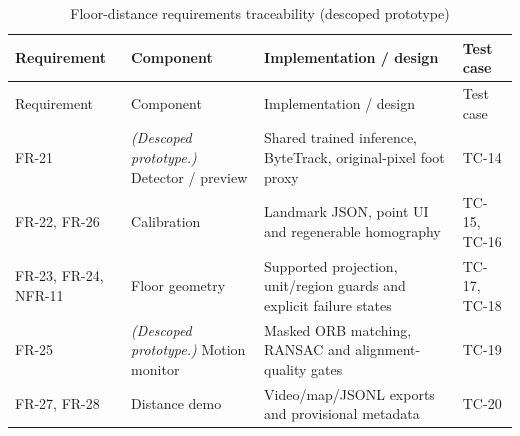 \begin{longtable}{P{0.16\textwidth}P{0.22\textwidth}P{0.32\textwidth}P{0.16\textwidth}}
\caption{Floor-distance requirements traceability (descoped prototype)}\label{tab:floor-traceability}\\
\toprule
Requirement & Component & Implementation / design & Test case\\
\midrule
\endfirsthead
\toprule
Requirement & Component & Implementation / design & Test case\\
\midrule
\endhead
FR-21 & \textit{(Descoped prototype.)} Detector / preview & Shared trained inference, ByteTrack, original-pixel foot proxy & TC-14\\
FR-22, FR-26 & Calibration & Landmark JSON, point UI and regenerable homography & TC-15, TC-16\\
FR-23, FR-24, NFR-11 & Floor geometry & Supported projection, unit/region guards and explicit failure states & TC-17, TC-18\\
FR-25 & \textit{(Descoped prototype.)} Motion monitor & Masked ORB matching, RANSAC and alignment-quality gates & TC-19\\
FR-27, FR-28 & Distance demo & Video/map/JSONL exports and provisional metadata & TC-20\\
\bottomrule
\end{longtable}
